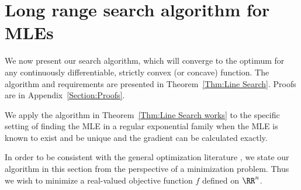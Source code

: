 \section{Long range search algorithm for MLEs} \label{Section:Algorithm}
We now present our search algorithm, which will converge to the optimum for any 
continuously differentiable, strictly 
convex (or concave) function.  The algorithm and requirements are presented in 
Theorem~\ref{Thm:Line Search}.  Proofs 
are in Appendix~\ref{Section:Proofs}. 


We apply the algorithm in Theorem~\ref{Thm:Line Search works} to the specific setting 
of finding the MLE in a regular 
exponential family when the MLE is known to exist and be unique and the gradient can 
be calculated exactly.

In order to be consistent with the general optimization literature \citep
{Fletcher,NW}, we state our algorithm in this 
section from the perspective of a minimization problem.  Thus we wish to minimize a 
real-valued objective function $f$ 
defined on $\RR^n$.  


